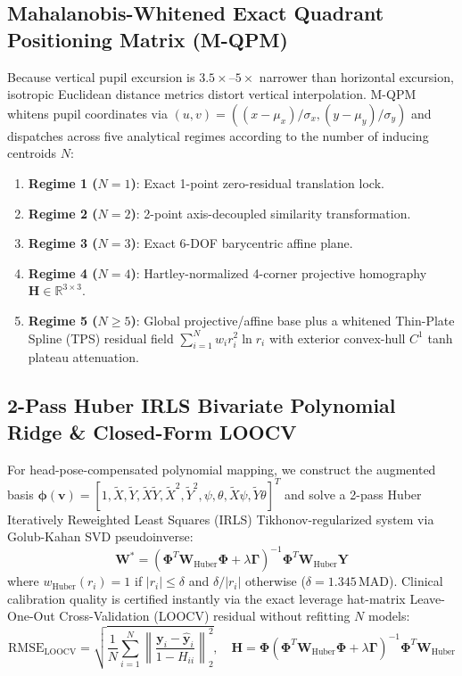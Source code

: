 \documentclass[twocolumn,10pt]{article}
\begin{document}
\subsection{Mahalanobis-Whitened Exact Quadrant Positioning Matrix (M-QPM)}
Because vertical pupil excursion is $3.5\times\text{--}5\times$ narrower than horizontal excursion, isotropic Euclidean distance metrics distort vertical interpolation. M-QPM whitens pupil coordinates via $(u, v) = ((x - \mu_x)/\sigma_x, (y - \mu_y)/\sigma_y)$ and dispatches across five analytical regimes according to the number of inducing centroids $N$:
\begin{enumerate}
    \item \textbf{Regime 1 ($N=1$)}: Exact 1-point zero-residual translation lock.
    \item \textbf{Regime 2 ($N=2$)}: 2-point axis-decoupled similarity transformation.
    \item \textbf{Regime 3 ($N=3$)}: Exact 6-DOF barycentric affine plane.
    \item \textbf{Regime 4 ($N=4$)}: Hartley-normalized 4-corner projective homography $\mathbf{H} \in \mathbb{R}^{3\times 3}$.
    \item \textbf{Regime 5 ($N \ge 5$)}: Global projective/affine base plus a whitened Thin-Plate Spline (TPS) residual field $\sum_{i=1}^N w_i r_i^2 \ln r_i$ with exterior convex-hull $C^1$ tanh plateau attenuation.
\end{enumerate}

\subsection{2-Pass Huber IRLS Bivariate Polynomial Ridge & Closed-Form LOOCV}
For head-pose-compensated polynomial mapping, we construct the augmented basis $\boldsymbol{\phi}(\mathbf{v}) = [1, \tilde{X}, \tilde{Y}, \tilde{X}\tilde{Y}, \tilde{X}^2, \tilde{Y}^2, \psi, \theta, \tilde{X}\psi, \tilde{Y}\theta]^T$ and solve a 2-pass Huber Iteratively Reweighted Least Squares (IRLS) Tikhonov-regularized system via Golub-Kahan SVD pseudoinverse:
\begin{equation}
\mathbf{W}^* = \left(\mathbf{\Phi}^T \mathbf{W}_{\text{Huber}} \mathbf{\Phi} + \lambda \mathbf{\Gamma}\right)^{-1} \mathbf{\Phi}^T \mathbf{W}_{\text{Huber}} \mathbf{Y}
\end{equation}
where $w_{\text{Huber}}(r_i) = 1$ if $|r_i| \le \delta$ and $\delta / |r_i|$ otherwise ($\delta = 1.345\,\text{MAD}$). Clinical calibration quality is certified instantly via the exact leverage hat-matrix Leave-One-Out Cross-Validation (LOOCV) residual without refitting $N$ models:
\begin{equation}
\text{RMSE}_{\text{LOOCV}} = \sqrt{\frac{1}{N}\sum_{i=1}^{N} \left\|\frac{\mathbf{y}_i - \hat{\mathbf{y}}_i}{1 - H_{ii}}\right\|_2^2}, \quad \mathbf{H} = \mathbf{\Phi}\left(\mathbf{\Phi}^T \mathbf{W}_{\text{Huber}} \mathbf{\Phi} + \lambda\mathbf{\Gamma}\right)^{-1}\mathbf{\Phi}^T \mathbf{W}_{\text{Huber}}
\end{equation}
\end{document}
